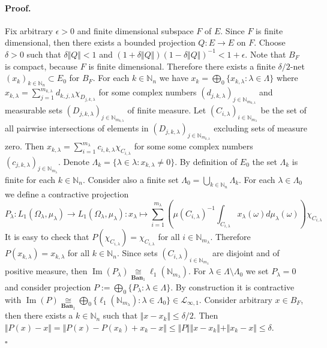 \documentclass[12pt]{article}
\newcommand{\isom}[1]{\mathop{\mathbin{\cong}}\limits_{#1}}
\renewenvironment{proof}{\paragraph{Proof.}}{\hfill$\square$\medskip}
\begin{document}
\begin{proof}
Fix arbitrary $\epsilon>0$ and finite dimensional subspace $F$ of $E$. Since $F$ is finite dimensional, then there exists a bounded projection $Q:E\to E$ on $F$. Choose $\delta>0$ such that $\delta\Vert Q\Vert<1$ and $(1+\delta\Vert Q\Vert)(1-\delta\Vert Q\Vert)^{-1}<1+\epsilon$. Note that $B_F$ is compact, because $F$ is finite dimensional. Therefore there exists a finite $\delta/2$-net $(x_k)_{k\in\mathbb{N}_n}\subset E_0$ for $B_F$. For each $k\in\mathbb{N}_n$ we have $x_k=\bigoplus_0\{x_{k,\lambda}:\lambda\in\Lambda\}$ where $x_{k,\lambda}=\sum_{j=1}^{m_{k,\lambda}}d_{k,j,\lambda}\chi_{D_{j,k,\lambda}}$ for some complex numbers $(d_{j,k,\lambda})_{j\in\mathbb{N}_{m_{k,\lambda}}}$ and measurable sets $(D_{j,k,\lambda})_{j\in\mathbb{N}_{m_{k,\lambda}}}$ of finite measure. Let $(C_{i,\lambda})_{i\in\mathbb{N}_{m_\lambda}}$ be the set of all pairwise intersections of elements in $(D_{j,k,\lambda})_{j\in\mathbb{N}_{m_{k,\lambda}}}$ excluding sets of measure zero. Then $x_{k,\lambda}=\sum_{i=1}^{m_\lambda} c_{i,k,\lambda}\chi_{C_{i,\lambda}}$ for some some complex numbers $(c_{j,k,\lambda})_{j\in\mathbb{N}_{m_{\lambda}}}$. Denote $\Lambda_k=\{\lambda\in\lambda:x_{k,\lambda}\neq 0\}$. By definition of $E_0$ the set $\Lambda_k$ is finite for each $k\in\mathbb{N}_n$. Consider also a finite set $\Lambda_0=\bigcup_{k\in\mathbb{N}_n}\Lambda_k$. For each $\lambda\in\Lambda_0$ we define a contractive projection 
$$
P_\lambda:L_1(\Omega_\lambda,\mu_\lambda)\to L_1(\Omega_\lambda,\mu_\lambda):x_\lambda\mapsto \sum_{i=1}^{m_\lambda}\left( \mu(C_{i,\lambda})^{-1}\int_{C_{i,\lambda}}x_\lambda(\omega)d\mu_\lambda(\omega)\right)\chi_{C_{i,\lambda}}
$$
It is easy to check that $P(\chi_{C_{i,\lambda}})=\chi_{C_{i,\lambda}}$ for all $i\in\mathbb{N}_{m_\lambda}$. Therefore $P(x_{k,\lambda})=x_{k,\lambda}$ for all $k\in\mathbb{N}_n$. Since sets $(C_{i,\lambda})_{i\in\mathbb{N}_{m_\lambda}}$ are disjoint and of positive measure, then $\operatorname{Im}(P_\lambda)\isom{\mathbf{Ban}_1}\ell_1(\mathbb{N}_{m_\lambda})$. For $\lambda\in\Lambda\setminus\Lambda_0$ we set $P_\lambda=0$ and consider projection $P:=\bigoplus_0\{P_\lambda:\lambda\in\Lambda\}$. By construction it is contractive with $\operatorname{Im}(P)\isom{\mathbf{Ban}_1}\bigoplus_0\{\ell_1(\mathbb{N}_{m_\lambda}):\lambda\in\Lambda_0\}\in\mathcal{L}_{\infty,1}$. Consider arbitrary $x\in B_F$, then there exists a $k\in\mathbb{N}_n$ such that $\Vert x-x_k\Vert\leq \delta/2$. Then $\Vert P(x)-x\Vert=\Vert P(x)-P(x_k)+x_k-x\Vert\leq\Vert P\Vert\Vert x-x_k\Vert+\Vert x_k-x\Vert\leq\delta$.


\end{proof}
\end{document}
